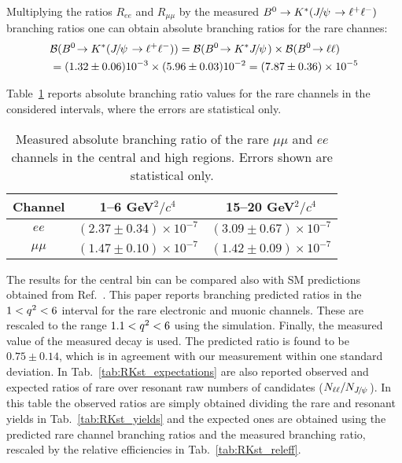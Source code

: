 Multiplying the ratios $R_{ee}$ and $R_{\mu\mu}$ by the measured $\Bz\to\Kstar (\jpsi\to\ell^+\ell^-)$~\cite{PDG2014}
branching ratios one can obtain absolute branching ratios for the rare channes:
%
\begin{equation}
\begin{split}
&\BR(\decay{\Bz}{\Kstar(\jpsi\to\ell^+\ell^-)}) = \BR(\decay{\Bz}{\Kstar\jpsi}) \times \BR(\decay{\Bz}{\ell\ell}) \\
& = (1.32 \pm 0.06) 10^{-3} \times (5.96 \pm 0.03) 10^{-2} = (7.87 \pm 0.36) \times 10^{-5}
\end{split}
\end{equation}

Table~\ref{tab:RKst_abs_BR} reports absolute branching ratio values for the rare channels in the considered 
\qsq intervals, where the errors are statistical only.
%
\begin{table}[h]
\centering
\caption{Measured absolute branching ratio of the rare $\mu\mu$ and $ee$ channels in
the central and high \qsq regions. Errors shown are statistical only. }
\begin{tabular}{|c|c|c|}
\hline
 Channel 			& 1--6 GeV$^2/c^4$ & 15--20 GeV$^2/c^4$\\ \hline
$ee$ 	& $( 2.37  \pm  0.34 )\times 10^{-7}$ 	& $( 3.09  \pm  0.67 )\times 10^{-7}$ \\
 $\mu\mu$ 	& $( 1.47  \pm  0.10 )\times 10^{-7}$ 	& $( 1.42  \pm  0.09 )\times 10^{-7}$ \\
\hline 
 \end{tabular}

\label{tab:RKst_abs_BR}
\end{table}

The results for the central \qsq bin can be compared also with SM predictions obtained from Ref.~\cite{Ali:2002jg}.
This paper reports branching predicted ratios in the $1 < {q^2} < 6$ \gevgevcccc interval
for the rare electronic and muonic channels. These are rescaled to the range $1.1 < {q^2} < 6$ \gevgevcccc
using the simulation. Finally, the measured value of the measured \decay{\Bz}{\Kstar(\jpsi\to\ell^+\ell^-)}
decay is used. The predicted ratio is found to be $0.75 \pm 0.14$,
which is in agreement with our measurement within one standard deviation.
In Tab.~\ref{tab:RKst_expectations} are also reported observed and expected ratios of rare
over resonant raw numbers of candidates ($N_{\ell\ell} / N_{\jpsi}$). In this table the observed ratios
are simply obtained dividing the rare and resonant yields in Tab.~\ref{tab:RKst_yields}
and the expected ones are obtained using the predicted rare channel branching ratios and 
the measured \decay{\Bz}{\Kstar(\jpsi\to\ell^+\ell^-)} branching ratio, rescaled by the
relative efficiencies in Tab.~\ref{tab:RKst_releff}.  

